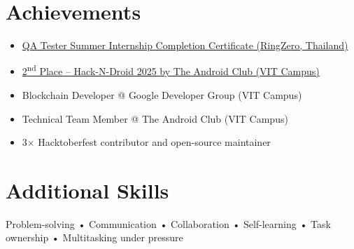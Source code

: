 \documentclass[letterpaper,11pt]{article}
\newcommand{\resumeItem}[1]{
  \item\small{#1 \vspace{-2pt}}
}
\newcommand{\resumeItemListStart}{\begin{itemize}[label=\textbullet, itemsep=1pt, parsep=0pt]}
\newcommand{\resumeItemListEnd}{\end{itemize}\vspace{-5pt}}
\begin{document}
\section{Achievements}
\resumeItemListStart
    \resumeItem{\href{https://drive.google.com/file/d/1lwzUITKUbr4pt5xL2clIDxR_SnFPlQj0/view?usp=sharing}{QA Tester Summer Internship Completion Certificate (RingZero, Thailand)}}
    \resumeItem{\href{https://drive.google.com/file/d/1DktSMRrmI7BohWGUEVe7tciaefPS4uhI/view?usp=sharing}{2\textsuperscript{nd} Place – Hack-N-Droid 2025 by The Android Club (VIT Campus)}}
    \resumeItem{Blockchain Developer @ Google Developer Group (VIT Campus)}
    \resumeItem{Technical Team Member @ The Android Club (VIT Campus)}
    \resumeItem{3$\times$ Hacktoberfest contributor and open-source maintainer}
\resumeItemListEnd

\section{Additional Skills}
\begin{center}
   Problem-solving • Communication • Collaboration • Self-learning • Task ownership • Multitasking under pressure
\end{center}
\end{document}
